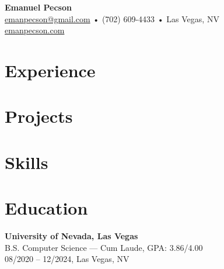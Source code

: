 \documentclass[letterpaper,10pt]{article}
\begin{document}
\begin{center}
    \textbf{\Huge Emanuel Pecson} \\
    \href{mailto:emanpecson@gmail.com}{emanpecson@gmail.com} • (702) 609-4433 • Las Vegas, NV \\
    \href{https://emanpecson.com}{emanpecson.com}
\end{center}

\vspace{0.5em}

\section*{Experience}




\section*{Projects}



\section*{Skills}


\section*{Education}
\textbf{University of Nevada, Las Vegas} \\
B.S. Computer Science — \textnormal{Cum Laude}, GPA: 3.86/4.00 \\
08/2020 – 12/2024, Las Vegas, NV
\end{document}
